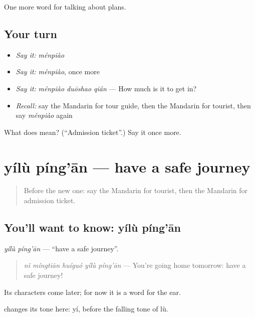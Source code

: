 \begin{grammarlens}[title={What you've built}]
One more word for talking about plans.
\end{grammarlens}

\subsection*{Your turn}
\begin{itemize}
\raggedright
  \item \emph{Say it:} \emph{ménpiào}
  \item \emph{Say it:} \emph{ménpiào}, once more
  \item \emph{Say it:} \emph{ménpiào duōshao qián} — How much is it to get in?
  \item \emph{Recall:} say the Mandarin for tour guide, then the Mandarin for tourist, then say \emph{ménpiào} again
\end{itemize}

\begin{tcolorbox}[breakable,colback=teal!4,colframe=teal!35!black,title={Before you move on}]
What does  mean? (\textquotedblleft{}Admission ticket\textquotedblright{}.) Say it once more.
\end{tcolorbox}
\section[yílù píng'ān]{yílù píng'ān — have a safe journey}

\label{lesson:ZH-C213-yilupingan}



\begin{quote}
Before the new one: say the Mandarin for tourist, then the Mandarin for admission ticket.
\end{quote}

\subsection*{You'll want to know: yílù píng'ān}
\emph{yílù píng'ān} — \textquotedblleft{}have a safe journey\textquotedblright{}.

\begin{quote}
\emph{nǐ míngtiān huíguó yílù píng'ān} — You're going home tomorrow: have a safe journey!
\end{quote}

Its characters come later; for now it is a word for the ear.

 changes its tone here: yí, before the falling tone of lù.

